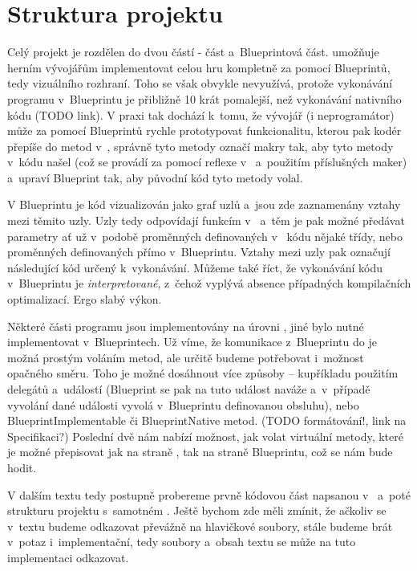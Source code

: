 
\section{Struktura projektu}

Celý projekt je rozdělen do dvou částí - \CPP{} část a~Blueprintová část. \UE{} umožňuje herním vývojářům implementovat celou hru kompletně za pomocí Blueprintů, tedy vizuálního rozhraní. Toho se však obvykle nevyužívá, protože vykonávání programu v~Blueprintu je přibližně 10 krát pomalejší, než vykonávání nativního \CPP{} kódu (TODO link). V praxi tak dochází k~tomu, že vývojář (i neprogramátor) může za pomocí Blueprintů rychle prototypovat funkcionalitu, kterou pak kodér přepíše do metod v~\CPP{}, správně tyto metody označí makry tak, aby \UE{} tyto metody v~kódu našel (což se provádí za pomocí reflexe v~\UBT{} a~použitím příslušných \CPP{} maker) a~upraví Blueprint tak, aby původní kód tyto metody volal.

 V Blueprintu je kód vizualizován jako graf uzlů a~jsou zde zaznamenány vztahy mezi těmito uzly. Uzly tedy odpovídají funkcím v~\CPP{} a~těm je pak možné předávat parametry ať už v~podobě proměnných definovaných v~\CPP{} kódu nějaké třídy, nebo proměnných definovaných přímo v~Blueprintu. Vztahy mezi uzly pak označují následující kód určený k~vykonávání. Můžeme také říct, že vykonávání kódu v~Blueprintu je \textit{interpretované}, z~čehož vyplývá absence případných kompilačních optimalizací. Ergo slabý výkon. 

Některé části programu jsou implementovány na úrovni \CPP{}, jiné bylo nutné implementovat v~Blueprintech. Už víme, že komunikace z~Blueprintu do \CPP{} je možná prostým voláním metod, ale určitě budeme potřebovat i~možnost opačného směru. Toho je možné dosáhnout více způsoby -- kupříkladu použitím delegátů a~událostí (Blueprint se pak na tuto událost naváže a~v~případě vyvolání dané události vyvolá v~Blueprintu definovanou obsluhu), nebo BlueprintImplementable či BlueprintNative metod. (TODO formátování!, link na Specifikaci?) Poslední dvě nám nabízí možnost, jak volat virtuální metody, které je možné přepisovat jak na straně \CPP{}, tak na straně Blueprintu, což se nám bude hodit.

V dalším textu tedy postupně probereme prvně kódovou část napsanou v~\CPP{} a~poté strukturu projektu s~samotném \UE{}. Ještě bychom zde měli zmínit, že ačkoliv se v~textu budeme odkazovat převážně na hlavičkové soubory, stále budeme brát v~potaz i~implementační, tedy  soubory a~obsah textu se může na tuto implementaci odkazovat.



